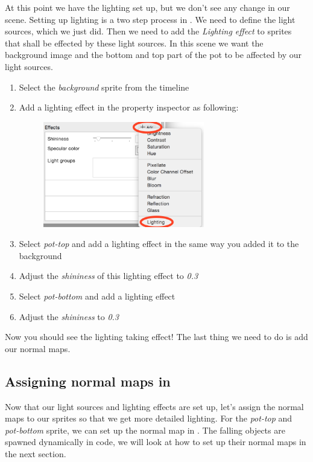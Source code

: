 At this point we have the lighting set up, but we don't see any change in our
scene. Setting up lighting is a two step process in \cocos{}. We need to define
the light sources, which we just did. Then we need to add the \textit{Lighting
effect} to sprites that shall be effected by these light sources. In this scene
we want the background image and the bottom and top part of the pot to be
affected by our light sources.

\begin{leftbar}
\begin{enumerate}
  \item Select the \textit{background} sprite from the timeline
  \item Add a lighting effect in the property inspector as following: 
  \begin{figure}[H]
    \centering
    \includegraphics[width=200pt]{images/Chapter9/add_lighting_effect.png}
  \end{figure}
  \item Select \textit{pot-top} and add a lighting effect in the same way you
  added it to the background
  \item Adjust the \textit{shininess} of this lighting effect to \textit{0.3}
  \item Select \textit{pot-bottom} and add a lighting effect
  \item Adjust the \textit{shininess} to \textit{0.3} 
\end{enumerate}
\end{leftbar}

Now you should see the lighting taking effect! The last thing we need to do is
add our normal maps.

\subsection{Assigning normal maps in \SB{}}
Now that our light sources and lighting effects are set up, let's assign the
normal maps to our sprites so that we get more detailed lighting. For the \textit{pot-top}
and \textit{pot-bottom} sprite, we can set up the normal map in \SB{}. The
falling objects are spawned dynamically in code, we will look at how to set up
their normal maps in the next section.

